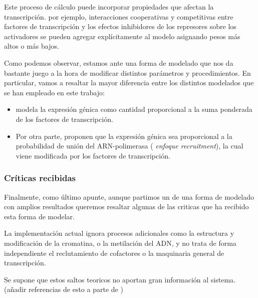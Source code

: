  
 Este proceso de cálculo puede incorporar propiedades que afectan la transcripción. por ejemplo, interacciones cooperativas y competitivas entre factores de transcripción y los efectos inhibidores de los represores sobre los activadores se pueden agregar explícitamente al modelo asignando pesos más altos o más bajos.
 
 Como podemos observar, estamos ante una forma de modelado que nos da bastante juego a la hora de modificar distintos parámetros y procedimientos. En particular, vamos a resaltar la mayor diferencia entre los distintos modelados que se han empleado en este trabajo:
 \begin{itemize}
 	\item \cite{schaffer} modela la expresión génica como cantidad proporcional a la suma ponderada de los factores de transcripción.
 	\item Por otra parte, \cite{cambon1} proponen que la expresión génica sea proporcional a la probabilidad de unión del ARN-polimerasa (\textit{ enfoque recruitment}), la cual viene modificada por los factores de transcripción.
 		
 		
 	\end{itemize}
 
 
 
 
 \subsubsection{Críticas recibidas}
 
 
 Finalmente, como último apunte, aunque partimos un de una forma de modelado con amplios resultados queremos resaltar algunas de las criticas que ha recibido esta forma de modelar.
 
 La implementación actual ignora procesos adicionales como la estructura y modificación de la cromatina, o la metilación del ADN, y no trata de forma independiente el reclutamiento de cofactores o la maquinaria general de transcripción.
 
  Se supone que estos saltos teoricos no aportan gran información al sistema. (añadir referencias de esto a parte de \cite{ay2011mathematical})